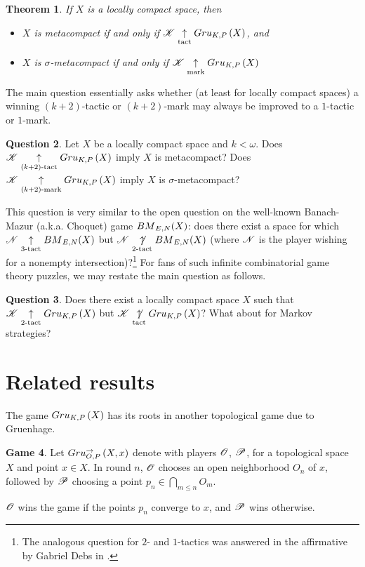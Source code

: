 \documentclass{amsart}
\newtheorem{theorem}{Theorem}[section]
\theoremstyle{definition}
\newtheorem{game}[theorem]{Game}
\newtheorem{question}[theorem]{Question}
\begin{document}
\begin{theorem}
  If $X$ is a locally compact space, then
  \begin{itemize}
    \item
    $X$ is metacompact if and only if $\mathscr{K}\underset{\text{tact}}{\uparrow}Gru_{K,P}\left({X}\right)$, and
    \item
    $X$ is $\sigma$-metacompact if and only if $\mathscr{K}\underset{\text{mark}}{\uparrow}Gru_{K,P}\left({X}\right)$
  \end{itemize}
\end{theorem}

The main question essentially asks whether (at least for locally compact
spaces) a winning $(k+2)$-tactic or $(k+2)$-mark may always be improved to a
$1$-tactic or $1$-mark.

\begin{question}
  Let $X$ be a locally compact space and $k<\omega$.
  Does $\mathscr{K}\underset{(k+2)\text{-tact}}{\uparrow}Gru_{K,P}\left({X}\right)$ imply $X$ is metacompact?
  Does $\mathscr{K}\underset{(k+2)\text{-mark}}{\uparrow}Gru_{K,P}\left({X}\right)$ imply $X$ is $\sigma$-metacompact?
\end{question}

This question is very similar to the open question on the well-known
Banach-Mazur (a.k.a. Choquet) game ${BM}_{E,N}(X)$: does there exist a
space for which
$\mathscr{N}\underset{3\text{-tact}}{\uparrow}{BM}_{E,N}(X)$ but $\mathscr{N}\underset{2\text{-tact}}{\not\uparrow}{BM}_{E,N}(X)$
(where $\mathscr{N}$
is the player wishing for a nonempty intersection)?\footnote{
  The analogous question for $2$- and $1$-tactics was answered in the
  affirmative by Gabriel Debs in \cite{MR817083}.
}
For fans
of such infinite combinatorial game theory puzzles, we may restate the
main question as follows.

\begin{question}
  Does there exist a locally compact space $X$ such that
  $\mathscr{K}\underset{2\text{-tact}}{\uparrow}Gru_{K,P}\left({X}\right)$ but $\mathscr{K}\underset{\text{tact}}{\not\uparrow}Gru_{K,P}\left({X}\right)$?
  What about for Markov strategies?
\end{question}


\section{Related results}

The game $Gru_{K,P}\left({X}\right)$ has its roots in another topological game due to
Gruenhage.

\begin{game}
  Let $Gru_{O,P}^{\to}\left({X},{x}\right)$ denote  with
  players $\mathscr{O}$, $\mathscr{P}$, for a topological space $X$ and point $x\in X$.
  In round $n$, $\mathscr{O}$ chooses an open neighborhood $O_n$ of $x$, followed
  by $\mathscr{P}$ choosing a point $p_n\in \bigcap_{m\leq n}O_m$.

  $\mathscr{O}$ wins the game if the points $p_n$ converge to $x$, and $\mathscr{P}$
  wins otherwise.
\end{game}
\end{document}
